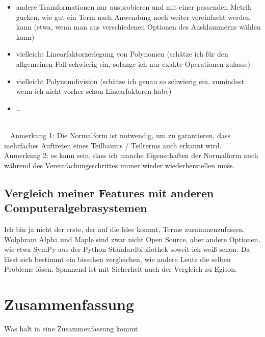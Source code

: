 \documentclass{scrartcl}
\numberwithin{figure}{section} %
\theoremstyle{definition} %
\begin{document}
\begin{itshape}
\begin{enumerate}
\begin{itemize}
        \item andere Transformationen nur ausprobieren und mit einer passenden Metrik gucken, wie gut ein Term nach Anwendung noch weiter vereinfacht werden kann (etwa, wenn man aus verschiedenen Optionen des Ausklammerns wählen kann)
        \item vielleicht Linearfaktorzerlegung von Polynomen (schätze ich für den allgemeinen Fall schwierig ein, solange ich nur exakte Operationen zulasse)
        \item vielleicht Polynomdivision (schätze ich genau so schwierig ein, zumindest wenn ich nicht vorher schon Linearfaktoren habe)
        \item \dots
    \end{itemize}
\end{enumerate}
~\\~
Anmerkung 1: Die Normalform ist notwendig, um zu garantieren, dass mehrfaches Auftreten eines Teilbaums / Teilterms auch erkannt wird. \\
Anmerkung 2: es kann sein, dass ich manche Eigenschaften der Normalform auch während des Vereinfachungsschrittes immer wieder wiederherstellen muss.

\subsection{Vergleich meiner Features mit anderen Computeralgebrasystemen}
Ich bin ja nicht der erste, der auf die Idee kommt, Terme zusammenzufassen. Wolphram Alpha und Maple sind zwar nicht Open Source, aber andere Optionen, wie etwa SymPy aus der Python Standardbibliothek soweit ich weiß schon. Da lässt sich bestimmt ein bisschen vergleichen, wie andere Leute die selben Probleme lösen.
Spannend ist mit Sicherheit auch der Vergleich zu Egison.
\end{itshape}


\section{Zusammenfassung}
\begin{itshape}
Was halt in eine Zusammenfassung kommt
\end{itshape}


\printbibliography
\end{document}
